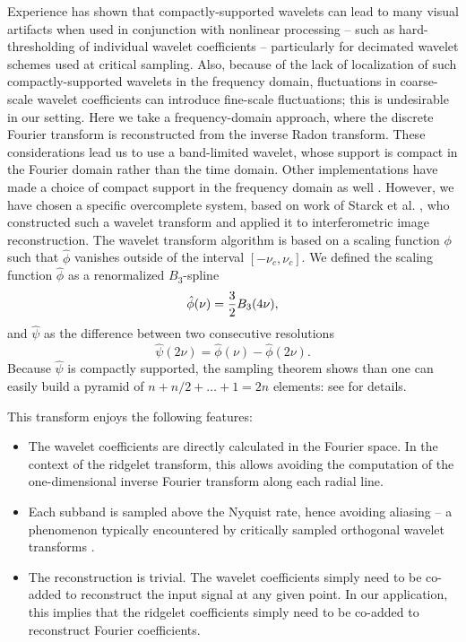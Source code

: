 Experience has shown that compactly-supported wavelets can lead to many
visual artifacts when  used in conjunction with nonlinear processing --
such as hard-thresholding of individual wavelet coefficients --
particularly for decimated wavelet schemes used at critical sampling.
Also, because of the lack of localization of such compactly-supported
wavelets in the frequency domain, fluctuations in coarse-scale wavelet
coefficients can introduce fine-scale fluctuations; this is
undesirable in our setting. Here we take a frequency-domain approach,
where the discrete Fourier transform is reconstructed from the inverse
Radon transform. These considerations lead us to use a band-limited
wavelet, whose support is compact in the Fourier domain rather than
the time domain. Other implementations have made a choice of compact
support in the frequency domain as well \cite{DRT,FRT}. However, we
have chosen a specific overcomplete system, based on work of Starck et
al. \cite{starck:sta94_3,starck:book98}, who constructed such  a
wavelet transform and applied it to interferometric image
reconstruction. The wavelet transform algorithm is based on a scaling
function $\phi$ such that $\hat{\phi}$ vanishes outside of the interval
$[-\nu_c, \nu_c]$.  We defined the scaling function
$\hat{\phi}$ as a renormalized $B_3$-spline
\[
\hat{\phi}(\nu)= {3\over 2} B_3(4\nu),
\]
and $\hat{\psi}$ as the difference between two consecutive resolutions
\[
\hat \psi(2\nu) = \hat \phi(\nu) - \hat \phi(2\nu).
\]
Because $\hat{\psi}$ is compactly supported, the sampling theorem
shows than one can easily build a pyramid of $n + n/2 + \ldots + 1 =
2n$ elements: see \cite{starck:book98} for details.

This transform enjoys the following features:
\begin{itemize}
\item The wavelet coefficients are directly calculated in the Fourier
      space. In the context of the ridgelet transform, this allows
      avoiding the computation of the one-dimensional inverse Fourier
      transform along each radial line.
\item Each subband is sampled above the Nyquist rate, hence
      avoiding aliasing -- a phenomenon typically encountered by critically
      sampled orthogonal wavelet transforms \cite{Steerable}.
\item The reconstruction is trivial. The wavelet coefficients simply
      need to be co-added to reconstruct the input signal at any given
      point. In our application, this implies that the ridgelet
coefficients
      simply need to be co-added to reconstruct Fourier coefficients.
\end{itemize}

